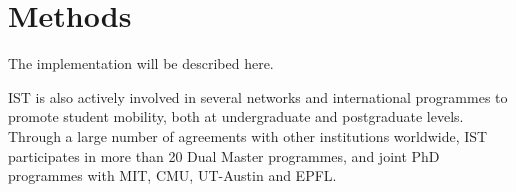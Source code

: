 \section{Methods}
The implementation will be described here.

IST is also actively involved in several networks and international programmes to promote student mobility, both at undergraduate and postgraduate levels. Through a large number of agreements with other institutions worldwide, IST participates in more than 20 Dual Master programmes, and joint PhD programmes with MIT, CMU, UT-Austin and EPFL.

